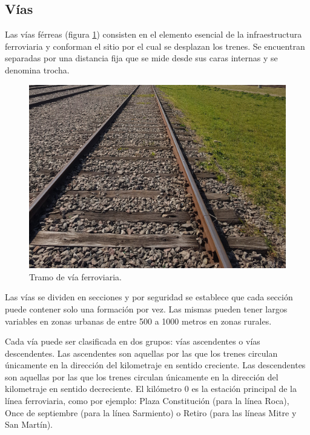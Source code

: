 		\subsection{Vías}
			
			Las vías férreas (figura \ref{fig:Via_eclisa}) consisten en el elemento esencial de la infraestructura ferroviaria y conforman el sitio por el cual se desplazan los trenes. Se encuentran separadas por una distancia fija que se mide desde sus caras internas y se denomina trocha.
			
			\begin{figure}[htbp!]
				\centering
				\includegraphics[scale=.07]{./Figures/Tramo_via}
				\caption{Tramo de vía ferroviaria.}
				\label{fig:Via_eclisa}
			\end{figure}	
			
			
			Las vías se dividen en secciones y por seguridad se establece que cada sección puede contener solo una formación por vez. Las mismas pueden tener largos variables en zonas urbanas de entre 500 a 1000 metros en zonas rurales. 
			
			Cada vía puede ser clasificada en dos grupos: vías ascendentes o vías descendentes. Las ascendentes son aquellas por las que los trenes circulan únicamente en la dirección del kilometraje en sentido creciente. Las descendentes son aquellas por las que los trenes circulan únicamente en la dirección del kilometraje en sentido decreciente\cite{RITO}. El kilómetro 0 es la estación principal de la línea ferroviaria, como por ejemplo: Plaza Constitución (para la línea Roca), Once de septiembre (para la línea Sarmiento) o Retiro (para las líneas Mitre y San Martín).
			
